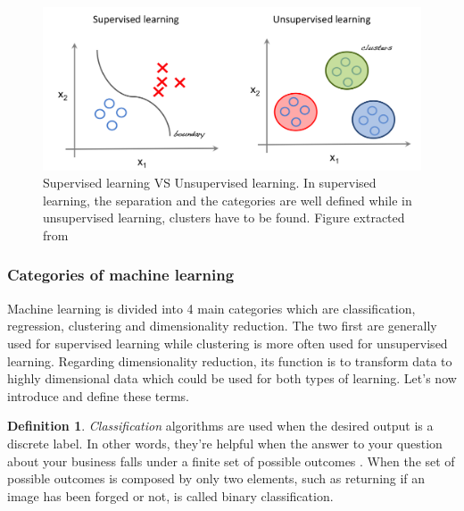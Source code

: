 \documentclass[11pt, openany]{report}
\theoremstyle{plain}
\theoremstyle{definition}
\newtheorem{defn}{Definition}[section]
\theoremstyle{remark}
\begin{document}
\begin{figure}[h]
  \centering
  \includegraphics[scale=0.32]{figures/supervised-unsupervised.png}
  \caption{Supervised learning VS Unsupervised learning. In supervised learning, the separation and the categories are well defined while in unsupervised learning, clusters have to be found. Figure extracted from \cite{supervisedVSunsupervised-1}}
  \label{fig:supervised-unsupervised}
\end{figure}


\newpage
\subsubsection{Categories of machine learning} \label{sec:categories-ML}
Machine learning is divided into 4 main categories which are classification, regression, clustering and dimensionality reduction. The two first are generally used for supervised learning while clustering is more often used for unsupervised learning. Regarding dimensionality reduction, its function is to transform data to highly dimensional data which could be used for both types of learning. Let's now introduce and define these terms. 

\begin{defn}
\textit{Classification} algorithms are used when the desired output is a discrete label. In other words, they're helpful when the answer to your question about your business falls under a finite set of possible outcomes \cite{class-regression-1}. 
When the set of possible outcomes is composed by only two elements, such as returning if an image has been forged or not, is called binary classification. 
\end{defn}
\end{document}
